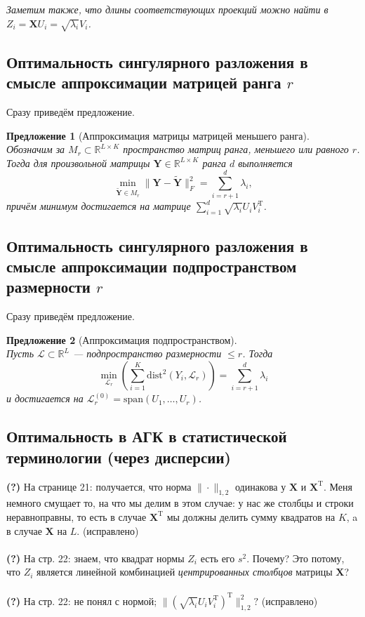 \documentclass[12pt,a4paper,final]{article}
\newtheorem{proposition}{Предложение}
\begin{document}
\textit{Заметим также, что длины соответствующих проекций можно найти в $Z_i = \bm X U_i = \sqrt{\lambda_i} V_i$.}

\subsection{Оптимальность сингулярного разложения в смысле аппроксимации матрицей ранга $r$}

Сразу приведём предложение.

\begin{proposition}[Аппроксимация матрицы матрицей меньшего ранга]
~\\
Обозначим за $M_r \subset \mathbb{R}^{L\times K}$ пространство матриц ранга, меньшего или равного $r$. Тогда для произвольной матрицы $\bm Y \in \mathbb{R}^{L\times K}$ ранга $d$ выполняется
$$\min_{\widetilde{\bm Y} \in M_r}{\|\bm Y -\widetilde{\bm Y} \|^2_F} = \sum_{i = r+1}^{d} \lambda_i,$$ причём минимум достигается на матрице $\sum_{i = 1}^d \sqrt{\lambda_i} U_i V_i^\mathrm{T}$.
\end{proposition}

\subsection{Оптимальность сингулярного разложения в смысле аппроксимации подпространством размерности $r$}

Сразу приведём предложение.

\begin{proposition}[Аппроксимация подпространством]
~\\
Пусть $\mathcal{L} \subset \mathbb{R}^L$ --- подпространство размерности $\leqslant r$. Тогда 
$$
\min_{\mathcal L_r} \left(\sum_{i = 1}^K\mathrm{dist}^2(Y_i, \mathcal L_r)\right) = \sum_{i = r + 1}^{d} \lambda_i
$$
и достигается на $\mathcal L_r^{(0)} = \mathrm{span}(U_1, \ldots, U_r)$.
\end{proposition}

\subsection{Оптимальность в АГК в статистической терминологии (через дисперсии)}

\textbf{(?)} На странице 21: получается, что норма $\|\cdot \|_{1,2}$ одинакова у $\bm X$ и $\bm X^\mathrm{T}$. Меня немного смущает то, на что мы делим в этом случае: у нас же столбцы и строки неравноправны, то есть в случае $\bm X^\mathrm{T}$ мы должны делить сумму квадратов на $K$,  a в случае $\bm X$ на $L$. (исправлено)
\\~\\
\textbf{(?)} На стр. 22: знаем, что квадрат нормы $Z_i$ есть его $s^2$. Почему? Это потому, что $Z_i$ является линейной комбинацией \textit{центрированных столбцов} матрицы $\bm X$? 
\\~\\
\textbf{(?)} На стр. 22: не понял с нормой; $\| (\sqrt{\lambda_i} U_i V_i^\mathrm{T})^\mathrm{T} \|^2_{1,2}?$ (исправлено)
\\~\\
\end{document}

